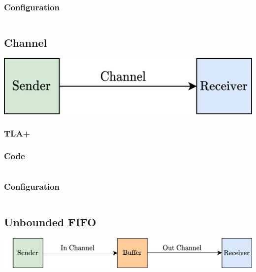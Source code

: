 \subsubsection{Configuration}
\inputminted{text}{tla_plus/code/AsyncMessage.cfg}

\subsection{Channel}
\begin{center}
    \includegraphics[width=.5\textwidth]{tla_plus/images/channel.drawio.png}
\end{center}
\subsubsection{TLA+}

\subsubsection{Code}
\inputminted{text}{tla_plus/code/Channel.tla}
\subsubsection{Configuration}
\inputminted{text}{tla_plus/code/Channel.cfg}

\subsection{Unbounded FIFO}
\begin{center}
    \includegraphics[width=.5\textwidth]{tla_plus/images/unbounded_FIFO.drawio.png}
\end{center}
\unfinished
